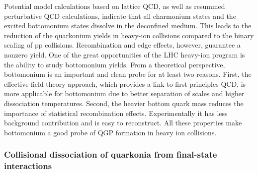 Potential model calculations based on lattice QCD, as well as resummed 
perturbative QCD calculations, indicate that all charmonium states and the
excited bottomonium states dissolve in the deconfined medium. This leads to 
the reduction of the quarkonium yields in heavy-ion collisions 
compared to the binary scaling of pp collisions. Recombination and edge
effects, however, guarantee a nonzero yield. One of the great opportunities of the 
LHC heavy-ion program is the ability to study bottomonium yields. 
From a theoretical perspective, bottomonium is an important and clean probe 
for at least two reasons. 
First, the effective field theory approach, which provides a link to first 
principles QCD, is more applicable for bottomonium due to better separation of 
scales and higher dissociation temperatures. Second, the heavier bottom quark 
mass reduces the importance of statistical recombination effects.
Experimentally it has less background contribution and is easy to reconstruct. 
All these properties make bottomonium a good probe of 
QGP formation in heavy ion collisions.














\subsubsection{Collisional dissociation of quarkonia from final-state interactions}

